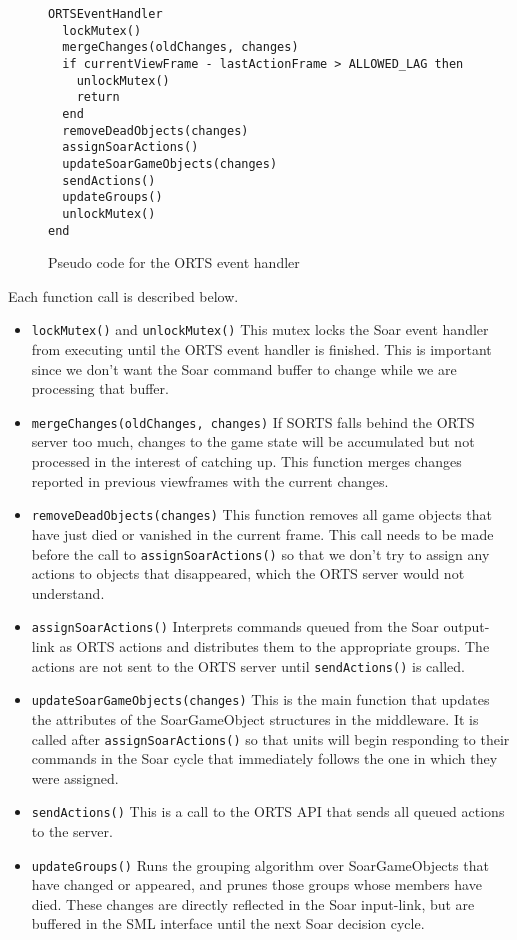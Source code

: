 \begin{figure}
\begin{verbatim}
ORTSEventHandler
  lockMutex()
  mergeChanges(oldChanges, changes)
  if currentViewFrame - lastActionFrame > ALLOWED_LAG then
    unlockMutex()
    return
  end
  removeDeadObjects(changes)
  assignSoarActions()
  updateSoarGameObjects(changes)
  sendActions()
  updateGroups()
  unlockMutex()
end
\end{verbatim}
\caption{Pseudo code for the ORTS event handler}
\label{fig:OrtsEventHandler}
\end{figure}

Each function call is described below.

\begin{itemize}

\item \verb|lockMutex()| and \verb|unlockMutex()|
  This mutex locks the Soar event handler from executing until the
  ORTS event handler is finished. This is important since we don't want
  the Soar command buffer to change while we are processing that buffer.

\item \verb|mergeChanges(oldChanges, changes)|
  If SORTS falls behind the ORTS server too much, changes to the game
  state will be accumulated but not processed in the interest of
  catching up. This function merges changes reported in previous
  viewframes with the current changes.

\item \verb|removeDeadObjects(changes)|
  This function removes all game objects that have just died or vanished
  in the current frame. This call needs to be made before the call to
  \verb|assignSoarActions()| so that we don't try to assign any actions
  to objects that disappeared, which the ORTS server would not
  understand.

\item \verb|assignSoarActions()|
  Interprets commands queued from the Soar output-link as ORTS actions and
  distributes them to the appropriate groups. The actions are not sent
  to the ORTS server until \verb|sendActions()| is called.

\item \verb|updateSoarGameObjects(changes)|
  This is the main function that updates the attributes of the
  SoarGameObject structures in the middleware. It is called after
  \verb|assignSoarActions()| so that units will begin responding to
  their commands in the Soar cycle that immediately follows the one in
  which they were assigned.

\item \verb|sendActions()|
  This is a call to the ORTS API that sends all queued actions to the
  server.

\item \verb|updateGroups()|
  Runs the grouping algorithm over SoarGameObjects that have changed or
  appeared, and prunes those groups whose members have died. These
  changes are directly reflected in the Soar input-link, but are
  buffered in the SML interface until the next Soar decision cycle.

\end{itemize}

